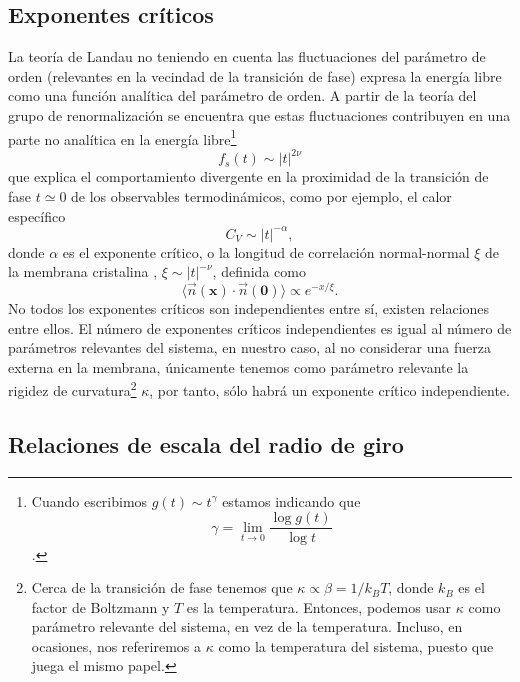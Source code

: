 \subsection{Exponentes críticos}
\label{exponentes_criticos}
La teoría de Landau no teniendo en cuenta las fluctuaciones del parámetro de
orden (relevantes en la vecindad de la transición de fase) expresa la energía
libre como una función analítica del parámetro de orden. A partir de la teoría
del grupo de renormalización \cite{Cardy} se encuentra que estas fluctuaciones contribuyen
en una parte no analítica en la energía libre\footnote{Cuando escribimos
  $g(t)\sim t^{\gamma}$ estamos indicando que $$\gamma=\lim_{t\rightarrow
  0}\frac{\log g(t)}{\log t}$$.}
\begin{equation}
f_s(t)\sim|t|^{2\nu}
\end{equation}
que explica el comportamiento divergente en la proximidad de la transición de
fase $t\simeq 0$ de los observables termodinámicos, como por ejemplo, el calor específico
\begin{equation*}
C_V\sim|t|^{-\alpha},
\end{equation*}
donde $\alpha$ es el exponente crítico, o la longitud de correlación
normal-normal $\xi$ de la membrana cristalina \cite{David:normal}, $\xi\sim|t|^{-\nu}$,
definida como
\begin{equation*}
\langle \vec{n}(\mathbf{x})\cdot\vec{n}(\mathbf{0})\rangle\propto e^{-x/\xi}.
\end{equation*}
No todos los exponentes críticos son independientes entre sí, existen
relaciones entre ellos. El número de exponentes críticos independientes es
igual al número de parámetros relevantes del sistema, en nuestro caso, al no
considerar una fuerza externa en la membrana, únicamente tenemos como
parámetro relevante la rigidez de curvatura\footnote{Cerca de la transición de
  fase tenemos que $\kappa\propto \beta=1/k_BT$, donde $k_B$ es el factor de
  Boltzmann y $T$ es la temperatura. Entonces, podemos usar $\kappa$ como
  parámetro relevante del sistema, en vez de la temperatura. Incluso, en
  ocasiones, nos referiremos a $\kappa$ como la temperatura del sistema,
  puesto que juega el mismo papel.}  $\kappa$, por
tanto, sólo habrá un exponente 
crítico independiente.

\subsection{Relaciones de escala del radio de giro}

